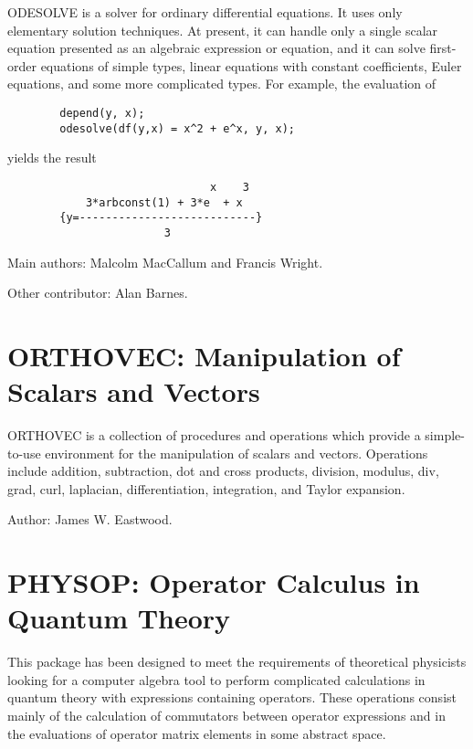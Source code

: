 
ODESOLVE is a solver for ordinary differential equations.  It uses
only elementary solution techniques.  At present, it can handle only a
single scalar equation presented as an algebraic expression or
equation, and it can solve first-order equations of simple types,
linear equations with constant coefficients, Euler equations, and some
more complicated types.  For example, the evaluation of
\begin{verbatim}
        depend(y, x);
        odesolve(df(y,x) = x^2 + e^x, y, x);
\end{verbatim}
yields the result
\begin{verbatim}
                               x    3
            3*arbconst(1) + 3*e  + x
        {y=---------------------------}
                        3
\end{verbatim}

Main authors: Malcolm MacCallum and Francis Wright.

Other contributor: Alan Barnes.



\newpage


\section{ORTHOVEC: Manipulation of Scalars and Vectors}


ORTHOVEC is a collection of \REDUCE procedures and operations which
provide a simple-to-use environment for the manipulation of scalars and
vectors.  Operations include addition, subtraction, dot and cross
products, division, modulus, div, grad, curl, laplacian, differentiation,
integration, and Taylor expansion.

Author: James W. Eastwood.



\newpage


\section{PHYSOP: Operator Calculus in Quantum Theory}


This package has been designed to meet the requirements of theoretical
physicists looking for a computer algebra tool to perform complicated
calculations in quantum theory with expressions containing operators.
These operations consist mainly of the calculation of commutators between
operator expressions and in the evaluations of operator matrix elements in
some abstract space.

